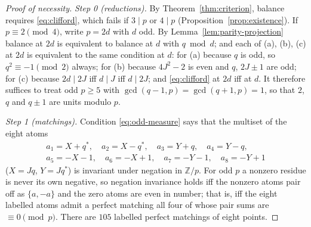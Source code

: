 \documentclass[11pt]{article}
\theoremstyle{definition}
\newcommand{\Z}{\mathbb Z}
\begin{document}
\begin{proof}[Proof of necessity]
\emph{Step 0 (reductions).}  By Theorem~\ref{thm:criterion}, balance
requires \eqref{eq:clifford}, which fails if $3\mid p$ or $4\mid p$
(Proposition~\ref{prop:existence}).  If $p\equiv2\pmod4$, write $p=2d$
with $d$ odd.  By Lemma~\ref{lem:parity-projection} balance at $2d$ is
equivalent to balance at $d$ with $q\bmod d$; and each of (a), (b), (c) at
$2d$ is equivalent to the same condition at $d$: for (a) because $q$ is
odd, so $q^2\equiv-1\pmod2$ always; for (b) because $4J^2-2$ is even and
$q$, $2J\pm1$ are odd; for (c) because $2d\mid2J$ iff $d\mid J$ iff
$d\mid2J$; and \eqref{eq:clifford} at $2d$ iff at $d$.  It therefore
suffices to treat odd $p\geq5$ with $\gcd(q-1,p)=\gcd(q+1,p)=1$, so that
$2$, $q$ and $q\pm1$ are units modulo $p$.

\emph{Step 1 (matchings).}  Condition \eqref{eq:odd-measure} says that
the multiset of the eight atoms
\begin{gather*}
 a_1=X+q^*,\quad a_2=X-q^*,\quad a_3=Y+q,\quad a_4=Y-q,\\
 a_5=-X-1,\quad a_6=-X+1,\quad a_7=-Y-1,\quad a_8=-Y+1
\end{gather*}
($X=Jq$, $Y=Jq^*$) is invariant under negation in $\Z/p$.  For odd $p$
a nonzero residue is never its own negative, so negation invariance holds
iff the nonzero atoms pair off as $\{a,-a\}$ and the zero atoms are even
in number; that is, iff the eight labelled atoms admit a perfect matching
all four of whose pair sums are $\equiv0\pmod p$.  There are $105$
labelled perfect matchings of eight points.


\end{proof}
\end{document}
